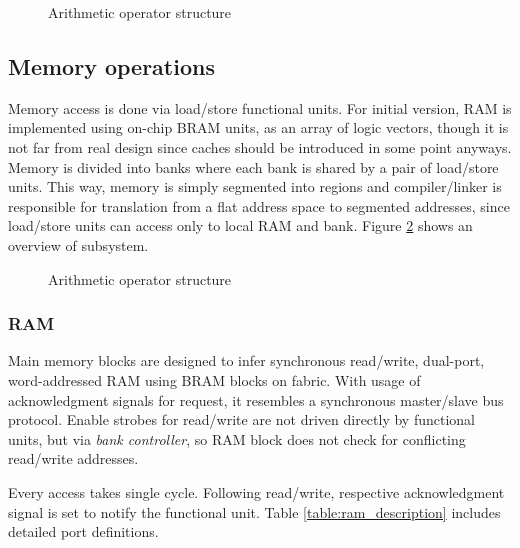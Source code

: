 	\begin{figure}[htbp]
		\centering
		\def\svgwidth{\columnwidth}
		
		\caption{Arithmetic operator structure}
		\label{fig:fu_alu} 
	\end{figure}
	\subsection{Memory operations}
	Memory access is done via load/store functional units. For initial version, RAM is implemented using on-chip BRAM units, as an array of logic vectors, though it is not far from real design since caches should be introduced in some point anyways. Memory is divided into banks where each bank is shared by a pair of load/store units. This way, memory is simply segmented into regions and compiler/linker is responsible for translation from a flat address space to segmented addresses, since load/store units can access only to local RAM and bank. Figure \ref{fig:mem_top} shows an overview of subsystem.
	
	\begin{figure}[htbp]
		\centering
		\def\svgscale{0.5}
		
		\caption{Arithmetic operator structure}
		\label{fig:mem_top} 
	\end{figure}
	
	\subsubsection{RAM}
	Main memory blocks are designed to infer synchronous read/write, dual-port, word-addressed RAM using BRAM blocks on fabric. With usage of acknowledgment signals for request, it resembles a synchronous master/slave bus protocol. Enable strobes for read/write are not driven directly by functional units, but via \textit{bank controller}, so RAM block does not check for conflicting read/write addresses. 
	
	Every access takes single cycle. Following read/write, respective acknowledgment signal is set to notify the functional unit. Table \ref{table:ram_description} includes detailed port definitions.
	 

